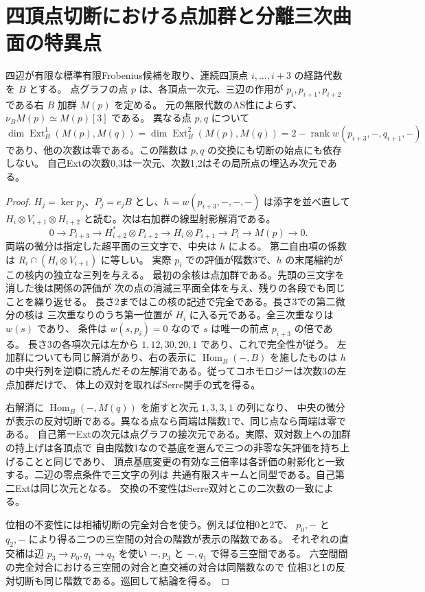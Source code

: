 \section{四頂点切断における点加群と分離三次曲面の特異点}
\label{sec:finite-cut-point-pairings}
\begin{theorem}\label{thm:finite-cut-point-pairings}
四辺が有限な標準有限Frobenius候補を取り、連続四頂点 $i,\ldots,i+3$ の経路代数を $B$ とする。
点グラフの点 $p$ は、各頂点一次元、三辺の作用が $p_i,p_{i+1},p_{i+2}$ である右 $B$ 加群 $M(p)$ を定める。
元の無限代数のAS性によらず、$\nu_B M(p)\simeq M(p)[3]$ である。
異なる点 $p,q$ について
\[
 \dim\operatorname{Ext}^1_B(M(p),M(q))
 =\dim\operatorname{Ext}^2_B(M(p),M(q))
 =2-\operatorname{rank} w(p_{i+3},-,q_{i+1},-)
\]
であり、他の次数は零である。この階数は $p,q$ の交換にも切断の始点にも依存しない。
自己Extの次数0,3は一次元、次数1,2はその局所点の埋込み次元である。
\end{theorem}
\begin{proof}
$H_j=\ker p_j$、$P_j=e_jB$ とし、$h=w(p_{i+3},-,-,-)$ は添字を並べ直して
$H_i\otimes V_{i+1}\otimes H_{i+2}$ と読む。次は右加群の線型射影解消である。
\[
 0\to P_{i+3}\to H_{i+2}^*\otimes P_{i+2}
 \to H_i\otimes P_{i+1}\to P_i\to M(p)\to0 .
\]
両端の微分は指定した超平面の三文字で、中央は $h$ による。
第二自由項の係数は $R_i\cap(H_i\otimes V_{i+1})$ に等しい。
実際 $p_i$ での評価が階数3で、$h$ の末尾縮約がこの核内の独立な三列を与える。
最初の余核は点加群である。先頭の三文字を消した後は関係の評価が
次の点の消滅三平面全体を与え、残りの各段でも同じことを繰り返せる。
長さ2まではこの核の記述で完全である。長さ3での第二微分の核は
三次重なりのうち第一位置が $H_i$ に入る元である。全三次重なりは $w(s)$ であり、
条件は $w(s,p_i)=0$ なので $s$ は唯一の前点 $p_{i+3}$ の倍である。
長さ3の各項次元は左から $1,12,30,20,1$ であり、これで完全性が従う。
左加群についても同じ解消があり、右の表示に $\operatorname{Hom}_B(-,B)$ を施したものは
$h$ の中央行列を逆順に読んだその左解消である。従ってコホモロジーは次数3の左点加群だけで、
体上の双対を取ればSerre関手の式を得る。

右解消に $\operatorname{Hom}_B(-,M(q))$ を施すと次元 $1,3,3,1$ の列になり、
中央の微分が表示の反対切断である。異なる点なら両端は階数1で、同じ点なら両端は零である。
自己第一Extの次元は点グラフの接次元である。実際、双対数上への加群の持上げは各頂点で
自由階数1なので基底を選んで三つの非零な矢評価を持ち上げることと同じであり、
頂点基底変更の有効な三倍率は各評価の射影化と一致する。二辺の零点条件で三文字の列は
共通有限スキームと同型である。自己第二Extは同じ次元となる。
交換の不変性はSerre双対とこの二次数の一致による。

位相の不変性には相補切断の完全対合を使う。例えば位相0と2で、
$p_0,-$ と $q_2,-$ により得る二つの三空間の対合の階数が表示の階数である。
それぞれの直交補は辺 $p_3\to p_0, q_1\to q_2$ を使い $-,p_3$ と $-,q_1$ で得る三空間である。
六空間間の完全対合における三空間の対合と直交補の対合は同階数なので
位相3と1の反対切断も同じ階数である。巡回して結論を得る。
\end{proof}

